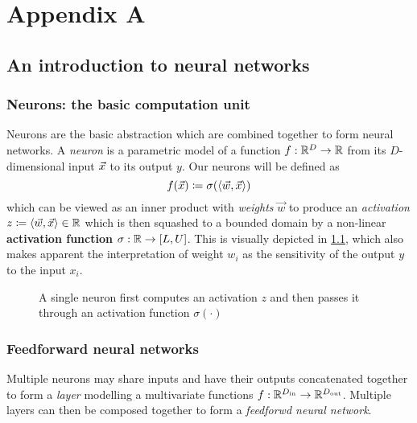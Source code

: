\chapter{Appendix A}

\ifpdf
    \graphicspath{{Appendix1/Raster/}{Appendix1/PDF/}{Appendix1/}}
\else
    \graphicspath{{Appendix1/Vector/}{Appendix1/}}
\fi

\section{An introduction to neural networks}\label{sec:primer-nn}

\subsection{Neurons: the basic computation unit}

Neurons are the basic abstraction which are combined together to form
neural networks. A \emph{neuron} is a parametric model of a function $f : \mathbb{R}^D \to
\mathbb{R}$ from its $D$-dimensional input $\vec{x}$ to its output $y$. Our neurons will be
defined as
\begin{equation}
    f(\vec{x}) \coloneqq \sigma( \langle \vec{w}, \vec{x} \rangle)
\end{equation}
which can be viewed as an inner product with \emph{weights} $\vec{w}$ to
produce an \emph{activation} $z \coloneqq \langle \vec{w}, \vec{x} \rangle
\in \mathbb{R}$ which is then squashed to a bounded domain by a non-linear
\textbf{activation function} $\sigma : \mathbb{R} \to [L, U]$. This is visually
depicted in \cref{fig:nn-single}, which also makes apparent the
interpretation of weight $w_i$ as the sensitivity of the output $y$ to the
input $x_i$.

\begin{figure}[tb]
    \centering
    
    \caption{A single neuron first computes an activation $z$ and then passes it through an activation function $\sigma(\cdot)$}
    \label{fig:nn-single}
\end{figure}

\subsection{Feedforward neural networks}

Multiple neurons may share inputs and have their outputs concatenated together
to form a \emph{layer} modelling a multivariate functions $f :
\mathbb{R}^{D_\text{in}} \to \mathbb{R}^{D_\text{out}}$. Multiple layers can then
be composed together to form a \emph{feedforwd neural network}.

